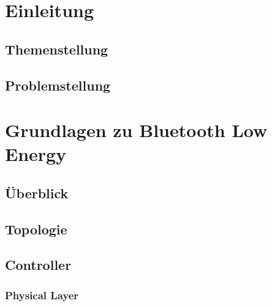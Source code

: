 \documentclass[doktyp=barbeit]{TUBAFarbeiten}
\begin{document}
\maketitle

\TUBAFErklaerungsseite



\tableofcontents
\newpage
\listoffigures
\listoftables

\newpage
\section{Einleitung}

	\subsection{Themenstellung}
		

	\subsection{Problemstellung}
		

\newpage
\section{Grundlagen zu Bluetooth Low Energy}

	\subsection{Überblick}
		

	\subsection{Topologie}
		

	\subsection{Controller}
		

		\subsubsection{Physical Layer}
\end{document}
